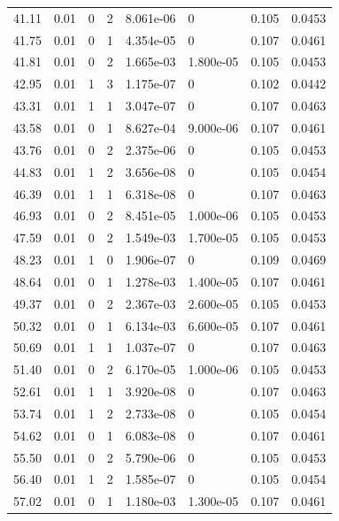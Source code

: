 \documentclass[preview]{standalone}
\begin{document}
{{{\begin{tabular}{L{1.2cm}C{1.2cm} C{0.3cm}C{0.5cm} C{1.4cm}C{1.4cm} C{1.4cm}C{1.4cm}}
  41.11  &  0.01  & 0     &  2 &  8.061e-06  & 0  & 0.105 &  0.0453   \\ 
  41.75  &  0.01  & 0     &  1 &  4.354e-05  & 0  & 0.107 &  0.0461   \\ 
  41.81  &  0.01  & 0     &  2 &  1.665e-03  & 1.800e-05  & 0.105 &  0.0453   \\ 
  42.95  &  0.01  & 1     &  3 &  1.175e-07  & 0  & 0.102 &  0.0442   \\ 
  43.31  &  0.01  & 1     &  1 &  3.047e-07  & 0  & 0.107 &  0.0463   \\ 
  43.58  &  0.01  & 0     &  1 &  8.627e-04  & 9.000e-06  & 0.107 &  0.0461   \\ 
  43.76  &  0.01  & 0     &  2 &  2.375e-06  & 0  & 0.105 &  0.0453   \\ 
  44.83  &  0.01  & 1     &  2 &  3.656e-08  & 0  & 0.105 &  0.0454   \\ 
  46.39  &  0.01  & 1     &  1 &  6.318e-08  & 0  & 0.107 &  0.0463   \\ 
  46.93  &  0.01  & 0     &  2 &  8.451e-05  & 1.000e-06  & 0.105 &  0.0453   \\ 
  47.59  &  0.01  & 0     &  2 &  1.549e-03  & 1.700e-05  & 0.105 &  0.0453   \\ 
  48.23  &  0.01  & 1     &  0 &  1.906e-07  & 0  & 0.109 &  0.0469   \\ 
  48.64  &  0.01  & 0     &  1 &  1.278e-03  & 1.400e-05  & 0.107 &  0.0461   \\ 
  49.37  &  0.01  & 0     &  2 &  2.367e-03  & 2.600e-05  & 0.105 &  0.0453   \\ 
  50.32  &  0.01  & 0     &  1 &  6.134e-03  & 6.600e-05  & 0.107 &  0.0461   \\ 
  50.69  &  0.01  & 1     &  1 &  1.037e-07  & 0  & 0.107 &  0.0463   \\ 
  51.40  &  0.01  & 0     &  2 &  6.170e-05  & 1.000e-06  & 0.105 &  0.0453   \\ 
  52.61  &  0.01  & 1     &  1 &  3.920e-08  & 0  & 0.107 &  0.0463   \\ 
  53.74  &  0.01  & 1     &  2 &  2.733e-08  & 0  & 0.105 &  0.0454   \\ 
  54.62  &  0.01  & 0     &  1 &  6.083e-08  & 0  & 0.107 &  0.0461   \\ 
  55.50  &  0.01  & 0     &  2 &  5.790e-06  & 0  & 0.105 &  0.0453   \\ 
  56.40  &  0.01  & 1     &  2 &  1.585e-07  & 0  & 0.105 &  0.0454   \\ 
  57.02  &  0.01  & 0     &  1 &  1.180e-03  & 1.300e-05  & 0.107 &  0.0461   \\ 

\end{tabular}}}}
\end{document}
